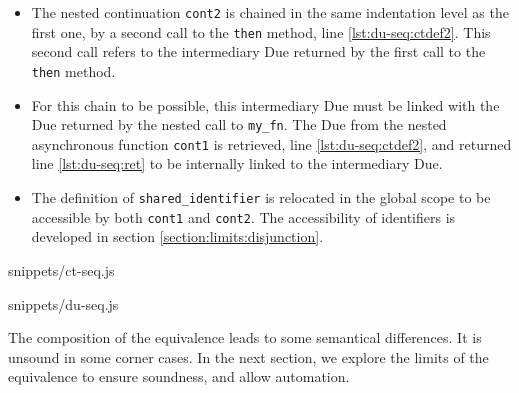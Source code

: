 \begin{itemize}
  \item The nested continuation \texttt{cont2} is chained in the same indentation level as the first one, by a second call to the \texttt{then} method, line \ref{lst:du-seq:ctdef2}.
  This second call refers to the intermediary Due returned by the first call to the \texttt{then} method.
  \item For this chain to be possible, this intermediary Due must be linked with the Due returned by the nested call to \texttt{my_fn}.  
  The Due from the nested asynchronous function \texttt{cont1} is retrieved, line \ref{lst:du-seq:ctdef2}, and returned line \ref{lst:du-seq:ret} to be internally linked to the intermediary Due.
  \item The definition of \texttt{shared_identifier} is relocated in the global scope to be accessible by both \texttt{cont1} and \texttt{cont2}. The accessibility of identifiers is developed in section \ref{section:limits:disjunction}.
\end{itemize}

             {snippets/ct-seq.js}

             {snippets/du-seq.js}

The composition of the equivalence leads to some semantical differences.
It is unsound in some corner cases.
In the next section, we explore the limits of the equivalence to ensure soundness, and allow automation.
